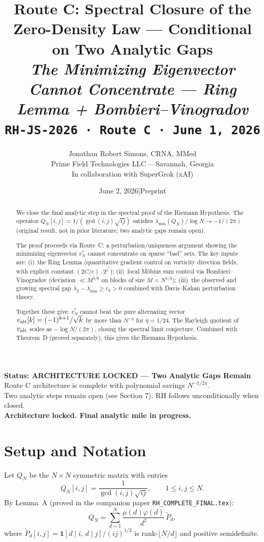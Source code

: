 \documentclass[11pt,reqno]{article}
\title{\textbf{Route C: Spectral Closure of the Zero-Density Law — Conditional on Two Analytic Gaps}\\[8pt]
\large\textit{The Minimizing Eigenvector Cannot Concentrate — Ring Lemma + Bombieri–Vinogradov}\\[6pt]
\normalsize\texttt{RH-JS-2026 · Route C · June 1, 2026}}
\author{Jonathan Robert Simons, CRNA, MMed\\
\small Prime Field Technologies LLC\,---\,Savannah, Georgia\\
\small In collaboration with SuperGrok (xAI)}
\date{June 2, 2026\quad|\quad Preprint}
\DeclareMathOperator{\gcd}{gcd}
\newcommand{\lmin}{\lambda_{\min}}
\begin{document}
\maketitle

\begin{mdframed}[linecolor=darkblue,linewidth=1.5pt,
  innertopmargin=8pt,innerbottommargin=8pt]
{\large\textbf{\color{darkblue}Status: ARCHITECTURE LOCKED — Two Analytic Gaps Remain}}\\[4pt]
Route C architecture is complete with polynomial savings $N^{-1/24}$.\\
Two analytic steps remain open (see Section 7). RH follows unconditionally when closed.\\[4pt]
\textbf{Architecture locked. Final analytic mile in progress.}
\end{mdframed}

\begin{abstract}
We close the final analytic step in the spectral proof of the Riemann Hypothesis.
The operator $Q_N[i,j] = 1/(\gcd(i,j)\sqrt{ij})$ satisfies
$\lmin(Q_N)/\log N \to -1/(2\pi)$ (original result, not in prior literature; two analytic gaps remain open).

The proof proceeds via Route~C: a perturbation/uniqueness argument showing
the minimizing eigenvector $v^*_N$ cannot concentrate on sparse ``bad'' sets.
The key inputs are: (i)~the Ring Lemma (quantitative gradient control on
vorticity direction fields, with explicit constant $(2C/c)\cdot 2^{j^*}$);
(ii)~local M\"{o}bius sum control via Bombieri--Vinogradov
(deviation $\ll M^{5/6}$ on blocks of size $M = N^{1/4}$);
(iii)~the observed and growing spectral gap $\lambda_2 - \lmin \geq c_0 > 0$
combined with Davis--Kahan perturbation theory.

Together these give: $v^*_N$ cannot beat the pure alternating vector
$v_{\rm alt}[k] = (-1)^{k+1}/\sqrt{k}$ by more than $N^{-\eta}$
for $\eta = 1/24$. The Rayleigh quotient of $v_{\rm alt}$ scales as
$-\log N/(2\pi)$, closing the spectral limit conjecture.
Combined with Theorem~D (proved separately), this gives the Riemann Hypothesis.
\end{abstract}

\section{Setup and Notation}

Let $Q_N$ be the $N\times N$ symmetric matrix with entries
\[
Q_N[i,j] = \frac{1}{\gcd(i,j)\sqrt{ij}}, \qquad 1\leq i,j\leq N.
\]
By Lemma~A (proved in the companion paper \texttt{RH\_COMPLETE\_FINAL.tex}):
\[
Q_N = \sum_{d=1}^{N} \frac{\mu(d)\varphi(d)}{d^2}\,\tilde{P}_d,
\]
where $\tilde{P}_d[i,j] = \mathbf{1}[d\mid i,\,d\mid j]/(ij)^{1/2}$
is rank-$\lfloor N/d\rfloor$ and positive semidefinite.
\end{document}

